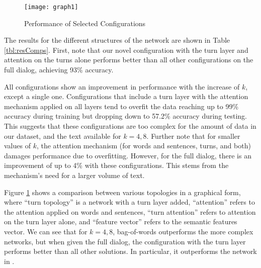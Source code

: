 \begin{figure}[]
    \hspace*{-0.8cm}
    \centering
        \centering
        \texttt{[image: graph1]}
        \caption{Performance of Selected Configurations}
        \label{graph:quality}
    \vspace{-4mm}
\end{figure}


The results for the different structures of the network are shown in Table \ref{tbl:resComps}. 
First, note that our novel configuration with the turn layer and attention on the turns alone 
performs better than all other configurations on the full dialog, 
achieving 93\% accuracy.

All configurations show an improvement in performance with the increase of $k$, 
except a single one. 
Configurations that include a turn layer with the attention mechanism applied on all layers 
tend to overfit the data reaching up to 99\% accuracy during training but 
dropping down to 57.2\% accuracy during testing. 
This suggests that these configurations are too complex for the amount of data in our dataset,
and the text available for $k=4,8$. 
Further note that for smaller values of $k$, the attention mechanism 
(for words and sentences, turns, and both) damages performance due to overfitting. 
However, for the full dialog, there is an improvement of up to 4\% with these configurations. 
This stems from the mechanism's need for a larger volume of text.

Figure \ref{graph:quality} shows a comparison between various topologies 
in a graphical form, where ``turn topology'' is a network with a turn layer added, 
``attention'' refers to the attention applied on words and sentences, 
``turn attention'' refers to attention on the turn layer alone, and 
``feature vector'' refers to the semantic features vector. 
We can see that for $k=4,8$, bag-of-words outperforms the more complex 
networks, but when given the full dialog, the configuration with the turn layer performs 
better than all other solutions. 
In particular, it outperforms the network in \cite{attention}. 


